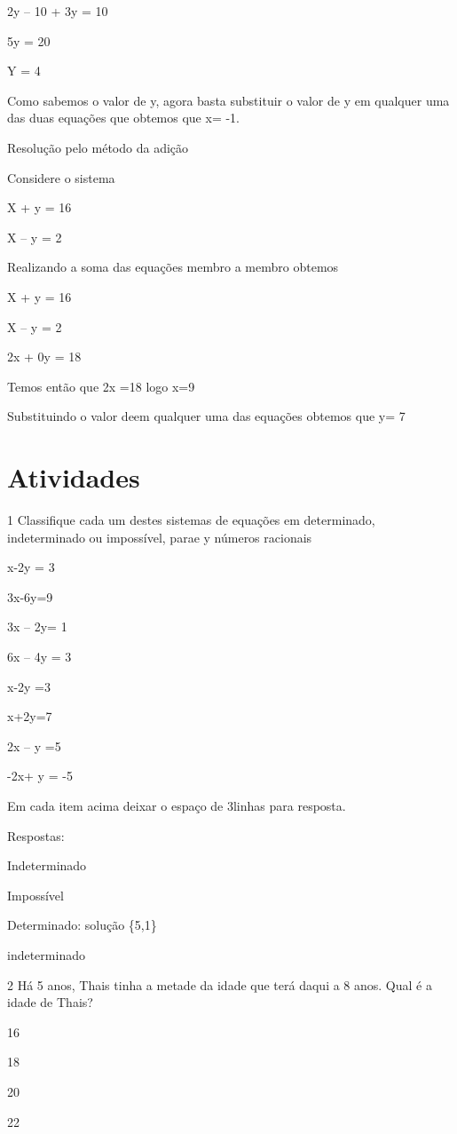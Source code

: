2y -- 10 + 3y = 10

5y = 20

Y = 4

Como sabemos o valor de y, agora basta substituir o valor de y em
qualquer uma das duas equações que obtemos que x= -1.

Resolução pelo método da adição

Considere o sistema

X + y = 16

X -- y = 2

Realizando a soma das equações membro a membro obtemos

X + y = 16

X -- y = 2

2x + 0y = 18

Temos então que 2x =18 logo x=9

Substituindo o valor de\times em qualquer uma das equações obtemos que y= 7

\section{Atividades}

\num{1} Classifique cada um destes sistemas de equações em determinado,
indeterminado ou impossível, para\times e y números racionais

\item x-2y = 3

3x-6y=9

\item 3x -- 2y= 1

6x -- 4y = 3

\item x-2y =3

x+2y=7

\item 2x -- y =5

-2x+ y = -5

Em cada item acima deixar o espaço de 3linhas para resposta.

Respostas:

\item Indeterminado
\item Impossível
\item Determinado: solução \{5,1\}
\item indeterminado

\num{2} Há 5 anos, Thais tinha a metade da idade que terá daqui a 8 anos.
Qual é a idade de Thais?

\item 16
\item 18
\item 20
\item 22

